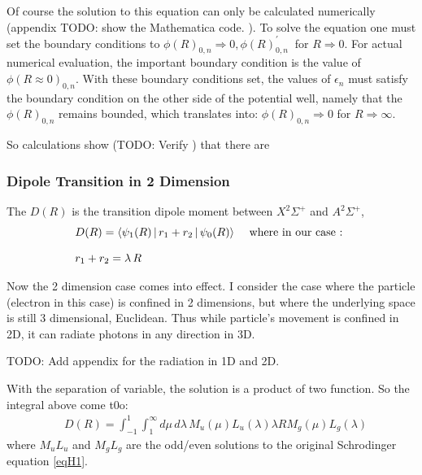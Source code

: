 Of course the solution to this equation can only be calculated numerically (appendix TODO: show the Mathematica code. ).  To solve the equation one must set the boundary conditions to  $ \phi(R)_{0,n} \Rightarrow 0, \phi(R)^{'}_{0,n} \ $ for $ R \Rightarrow 0 $. For actual numerical evaluation, the important boundary condition is the value of  $ \phi(R \approx 0 )_{0,n} $.  With these boundary conditions set, the values of $ \epsilon_n $ must satisfy the boundary condition on the other side of the potential well, namely  that the $ \phi(R)_{0,n} $ remains bounded, which translates into: $ \phi(R)_{0,n} \Rightarrow 0 $ for $ R \Rightarrow \infty $. 

So calculations show (TODO: Verify ) that there are 

\subsubsection{Dipole Transition in 2 Dimension}

The $ D(R) $ is the transition dipole moment  between $ X^2\Sigma^{+} $  and $ A^2\Sigma^{+} $, \begin{equation}
\begin{split}
& D(R) = \Braket{\psi_1(R) | r_1 +  r_2 | \psi_0(R) } \,\,\,\,\,\text{ where in our case : } \\[.8em]
& r_1 + r_2 = \lambda\, R
\end{split}
\end{equation}

Now the 2 dimension case comes into effect. I consider the case where the particle (electron in this case) is confined in 2 dimensions, but where the underlying space is still 3 dimensional, Euclidean. Thus while particle's movement is confined in 2D, it can radiate photons in any direction in 3D.

TODO: Add appendix for the radiation in 1D and 2D.

With the separation of variable, the solution is a product of two function. So the integral above come t0o:
\begin{equation}\label{Dint1}
\begin{split}
& D(R) = \int_{-1}^{1}{\int_{1}^{\infty}{ d\mu\, d\lambda\, M_u(\mu)L_u(\lambda)\lambda R M_g(\mu)L_g(\lambda) }}
\end{split}
\end{equation}
where $ M_uL_u $ and $ M_gL_g $ are the odd/even solutions to the original Schrodinger equation \eqref{eqH1}.

